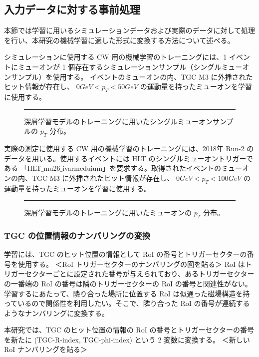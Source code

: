 \subsection{入力データに対する事前処理}
本節では学習に用いるシミュレーションデータおよび実際のデータに対して処理を行い、本研究の機械学習に適した形式に変換する方法について述べる。

シミュレーションに使用する CW 用の機械学習のトレーニングには、1 イベントにミューオンが 1 個存在するシミュレーションサンプル（シングルミューオンサンプル）を使用する。
イベントのミューオンの内、TGC M3 に外挿されたヒット情報が存在し、 $0 GeV < p_T < 50 GeV$ の運動量を持ったミューオンを学習に使用する。

\begin{figure}[thb]
  \centering
  \rule{8cm}{6cm}
  \caption{深層学習モデルのトレーニングに用いたシングルミューオンサンプルの $p_T$ 分布。}
  \label{fig:mu_pt_forMC}
\end{figure}

実際の測定に使用する CW 用の機械学習のトレーニングには、2018年 Run-2 のデータを用いる。使用するイベントには HLT のシングルミューオントリガーである 「HLT$\_$mu26$\_$ivarmeduium」を要求する。取得されたイベントのミューオンの内、TGC M3 に外挿されたヒット情報が存在し、 $0 GeV < p_{T} < 100 GeV$ の運動量を持ったミューオンを学習に使用する。

\begin{figure}[thb]
  \centering
  \rule{8cm}{6cm}
  \caption{深層学習モデルのトレーニングに用いたミューオンの $p_T$ 分布。}
  \label{fig:mu_pt_forData}
\end{figure}

\subsubsection{TGC の位置情報のナンバリングの変換}
学習には、TGC のヒット位置の情報として RoI の番号とトリガーセクターの番号を使用する。
＜RoI トリガーセクターのナンバリングの図を貼る＞
RoI はトリガーセクターごとに設定された番号が与えられており、あるトリガーセクターの一番端の RoI の番号は隣のトリガーセクターの RoI の番号と関連性がない。
学習するにあたって、隣り合った場所に位置する RoI は似通った磁場構造を持っているので関係性を利用したい。そこで、隣り合った RoI の番号が連続するようなナンバリングに変換する。

本研究では、TGC のヒット位置の情報の RoI の番号とトリガーセクターの番号を新たに (TGC-R-index, TGC-phi-index) という 2 変数に変換する。
＜新しいRoI ナンバリングを貼る＞


